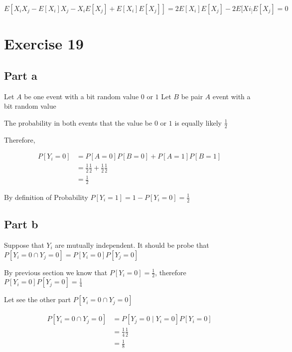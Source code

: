 \documentclass[12pt, a4paper]{article}
\begin{document}
\begin{equation}
  E[X_iX_j - E[X_i]X_j - X_iE[X_j] + E[X_i]E[X_j]] = 2E[X_i]E[X_j] - 2E[Xi_]E[X_j] = 0
\end{equation}

\section{Exercise 19}
\subsection{Part a}
Let $A$ be one event with a bit random value $0$ or $1$
Let $B$ be pair $A$ event with a bit random value

The probability in both events that the value be $0$ or $1$ is equally likely
$\frac{1}{2}$

Therefore,

\begin{subequations}
  \begin{align}
    P[Y_i = 0] &= P[A = 0]P[B = 0] + P[A = 1]P[B = 1]\\
               &= \frac{1}{2}\frac{1}{2} + \frac{1}{2}\frac{1}{2}\\
               &= \frac{1}{2} 
  \end{align}
\end{subequations}

By definition of Probability $P[Y_i = 1] = 1 - P[Y_i = 0] = \frac{1}{2}$

\subsection{Part b}
Suppose that $Y_i$ are mutually independent. It should be probe that $P[Y_i=0
\cap Y_j = 0] = P[Y_i=0]P[Y_j=0]$

By previous section we know that $P[Y_i=0] = \frac{1}{2}$, therefore
$P[Y_i=0]P[Y_j=0]=\frac{1}{4}$ \label{eq:4}

Let see the other part $P[Y_i = 0 \cap Y_j = 0]$

\begin{subequations}
  \begin{align}
    P[Y_i = 0 \cap Y_j = 0] &= P[Y_j = 0 \mid Y_i = 0] P[Y_i = 0]\\
                            &= \frac{1}{4} \frac{1}{2}\\
                            &= \frac{1}{8} \label{eq:5}
  \end{align}
\end{subequations}
\end{document}
